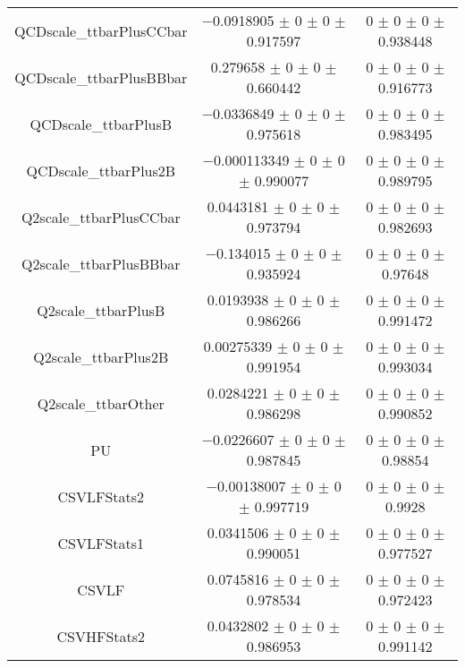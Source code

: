 \begin{table}
\begin{tabular}{ccc}
QCDscale\_ttbarPlusCCbar & \num{-0.0918905} $\pm$ \num{0} $\pm$ \num{0} $\pm$ \num{0.917597} & \num{0} $\pm$ \num{0} $\pm$ \num{0} $\pm$ \num{0.938448}\\
QCDscale\_ttbarPlusBBbar & \num{0.279658} $\pm$ \num{0} $\pm$ \num{0} $\pm$ \num{0.660442} & \num{0} $\pm$ \num{0} $\pm$ \num{0} $\pm$ \num{0.916773}\\
QCDscale\_ttbarPlusB & \num{-0.0336849} $\pm$ \num{0} $\pm$ \num{0} $\pm$ \num{0.975618} & \num{0} $\pm$ \num{0} $\pm$ \num{0} $\pm$ \num{0.983495}\\
QCDscale\_ttbarPlus2B & \num{-0.000113349} $\pm$ \num{0} $\pm$ \num{0} $\pm$ \num{0.990077} & \num{0} $\pm$ \num{0} $\pm$ \num{0} $\pm$ \num{0.989795}\\
Q2scale\_ttbarPlusCCbar & \num{0.0443181} $\pm$ \num{0} $\pm$ \num{0} $\pm$ \num{0.973794} & \num{0} $\pm$ \num{0} $\pm$ \num{0} $\pm$ \num{0.982693}\\
Q2scale\_ttbarPlusBBbar & \num{-0.134015} $\pm$ \num{0} $\pm$ \num{0} $\pm$ \num{0.935924} & \num{0} $\pm$ \num{0} $\pm$ \num{0} $\pm$ \num{0.97648}\\
Q2scale\_ttbarPlusB & \num{0.0193938} $\pm$ \num{0} $\pm$ \num{0} $\pm$ \num{0.986266} & \num{0} $\pm$ \num{0} $\pm$ \num{0} $\pm$ \num{0.991472}\\
Q2scale\_ttbarPlus2B & \num{0.00275339} $\pm$ \num{0} $\pm$ \num{0} $\pm$ \num{0.991954} & \num{0} $\pm$ \num{0} $\pm$ \num{0} $\pm$ \num{0.993034}\\
Q2scale\_ttbarOther & \num{0.0284221} $\pm$ \num{0} $\pm$ \num{0} $\pm$ \num{0.986298} & \num{0} $\pm$ \num{0} $\pm$ \num{0} $\pm$ \num{0.990852}\\
PU & \num{-0.0226607} $\pm$ \num{0} $\pm$ \num{0} $\pm$ \num{0.987845} & \num{0} $\pm$ \num{0} $\pm$ \num{0} $\pm$ \num{0.98854}\\
CSVLFStats2 & \num{-0.00138007} $\pm$ \num{0} $\pm$ \num{0} $\pm$ \num{0.997719} & \num{0} $\pm$ \num{0} $\pm$ \num{0} $\pm$ \num{0.9928}\\
CSVLFStats1 & \num{0.0341506} $\pm$ \num{0} $\pm$ \num{0} $\pm$ \num{0.990051} & \num{0} $\pm$ \num{0} $\pm$ \num{0} $\pm$ \num{0.977527}\\
CSVLF & \num{0.0745816} $\pm$ \num{0} $\pm$ \num{0} $\pm$ \num{0.978534} & \num{0} $\pm$ \num{0} $\pm$ \num{0} $\pm$ \num{0.972423}\\
CSVHFStats2 & \num{0.0432802} $\pm$ \num{0} $\pm$ \num{0} $\pm$ \num{0.986953} & \num{0} $\pm$ \num{0} $\pm$ \num{0} $\pm$ \num{0.991142}\\

\end{tabular}
\end{table}

